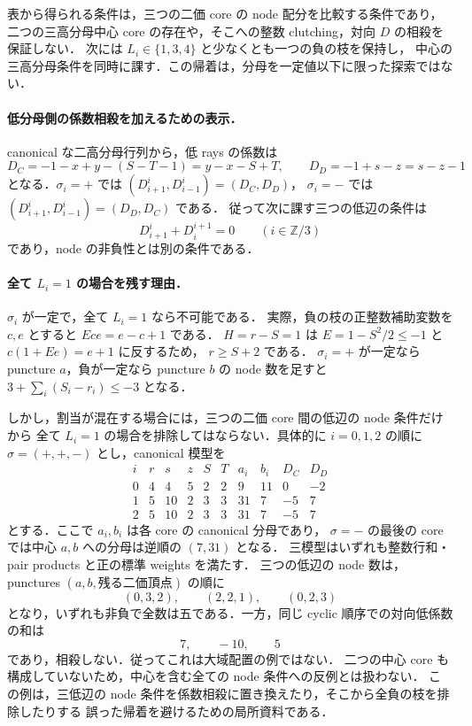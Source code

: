 表から得られる条件は，三つの二価 core の node 配分を比較する条件であり，
二つの三高分母中心 core の存在や，そこへの整数 clutching，対向 $D$ の相殺を保証しない．
次には $L_i\in\{1,3,4\}$ と少なくとも一つの負の枝を保持し，
中心の三高分母条件を同時に課す．この帰着は，分母を一定値以下に限った探索ではない．

\paragraph{低分母側の係数相殺を加えるための表示．}
canonical な二高分母行列から，低 rays の係数は
\[
 D_C=-1-x+y-(S-T-1)=y-x-S+T,
 \qquad D_D=-1+s-z=s-z-1
\]
となる．$\sigma_i=+$ では $(D^i_{i+1},D^i_{i-1})=(D_C,D_D)$，
$\sigma_i=-$ では $(D^i_{i+1},D^i_{i-1})=(D_D,D_C)$ である．
従って次に課す三つの低辺の条件は
\[
 D^i_{i+1}+D^{i+1}_i=0\qquad(i\in\mathbb Z/3)
\]
であり，node の非負性とは別の条件である．

\paragraph{全て $L_i=1$ の場合を残す理由．}
$\sigma_i$ が一定で，全て $L_i=1$ なら不可能である．
実際，負の枝の正整数補助変数を $c,e$ とすると $Ece=e-c+1$ である．
$H=r-S=1$ は $E=1-S^2/2\leq-1$ と $c(1+Ee)=e+1$ に反するため，
$r\geq S+2$ である．
$\sigma_i=+$ が一定なら puncture $a$，負が一定なら puncture $b$ の node 数を足すと
$3+\sum_i(S_i-r_i)\leq-3$ となる．

しかし，割当が混在する場合には，三つの二価 core 間の低辺の node 条件だけから
全て $L_i=1$ の場合を排除してはならない．具体的に $i=0,1,2$ の順に
$\sigma=(+,+,-)$ とし，canonical 模型を
\[
\begin{array}{c|rrrrr|rr|rr}
i&r&s&z&S&T&a_i&b_i&D_C&D_D\\\hline
0&4&4&5&2&2&9&11&0&-2\\
1&5&10&2&3&3&31&7&-5&7\\
2&5&10&2&3&3&31&7&-5&7
\end{array}
\]
とする．ここで $a_i,b_i$ は各 core の canonical 分母であり，
$\sigma=-$ の最後の core では中心 $a,b$ への分母は逆順の $(7,31)$ となる．
三模型はいずれも整数行和・pair products と正の標準 weights を満たす．
三つの低辺の node 数は，punctures $(a,b,\text{残る二価頂点})$ の順に
\[
 (0,3,2),\qquad(2,2,1),\qquad(0,2,3)
\]
となり，いずれも非負で全数は五である．一方，同じ cyclic 順序での対向低係数の和は
\[
 7,\qquad -10,\qquad 5
\]
であり，相殺しない．従ってこれは大域配置の例ではない．
二つの中心 core も構成していないため，中心を含む全ての node 条件への反例とは扱わない．
この例は，三低辺の node 条件を係数相殺に置き換えたり，そこから全負の枝を排除したりする
誤った帰着を避けるための局所資料である．

